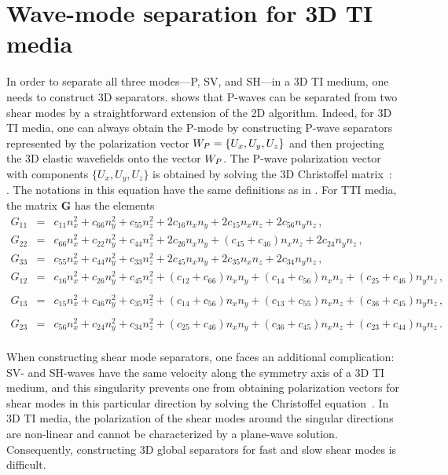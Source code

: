 \section{Wave-mode separation for 3D TI media}
In order to separate all three modes---P, SV, and SH---in a 3D TI
medium, one needs to construct 3D separators. \cite{dellinger.thesis}
shows that P-waves can be separated from two shear modes by a
straightforward extension of the 2D algorithm. Indeed, for 3D TI
media, one can always obtain the P-mode by constructing P-wave separators
represented by the polarization vector $W_P=\{U_x, U_y, U_z \}$
and then projecting the 3D elastic wavefields onto the vector $W_P$. The
P-wave polarization vector with components $\{U_x, U_y, U_z\}$ 
is obtained by solving the 3D
Christoffel matrix~\cite[]{akirichards.2002,Tsvankin}:
\beq\label{VtiChristoffel3d.ch3}
\lb 
\rb
\lb{}  \, .
\eeq
The notations in this equation have the same definitions as in .
For TTI media, the matrix ${\mathbf G}$ has the elements
\begin{eqnarray}
G_{11}&=&c_{11}n_x^2+c_{66}n_y^2+c_{55}n_z^2 
     +2 c_{16}n_xn_y+2 c_{15}n_xn_z+2c_{56}n_yn_z \, ,\\
G_{22}&=&c_{66}n_x^2+c_{22}n_y^2+c_{44}n_z^2 
     +2 c_{26}n_xn_y+ (c_{45}+c_{46})n_xn_z+2c_{24}n_yn_z \, ,\\
G_{33}&=&c_{55}n_x^2+c_{44}n_y^2+c_{33}n_z^2 
     +2 c_{45}n_xn_y+2 c_{35}n_xn_z+2c_{34}n_yn_z \, ,\\
G_{12}&=&c_{16}n_x^2+c_{26}n_y^2+c_{45}n_z^2 
     + (c_{12}+c_{66})n_xn_y+ (c_{14}+c_{56})n_xn_z+(c_{25}+c_{46})n_yn_z \, ,\nonumber\\ \\
G_{13}&=&c_{15}n_x^2+c_{46}n_y^2+c_{35}n_z^2 
     + (c_{14}+c_{56})n_xn_y+ (c_{13}+c_{55})n_xn_z+(c_{36}+c_{45})n_yn_z \, ,\nonumber\\\\
G_{23}&=&c_{56}n_x^2+c_{24}n_y^2+c_{34}n_z^2 
     + (c_{25}+c_{46})n_xn_y+ (c_{36}+c_{45})n_xn_z+(c_{23}+c_{44})n_yn_z \, .\nonumber\\
\end{eqnarray}

When constructing shear mode separators, one faces an additional
complication: SV- and SH-waves have the same velocity along the
symmetry axis of a 3D TI medium, and this singularity prevents one
from obtaining polarization vectors for shear modes in this
particular direction by solving the Christoffel
equation~\cite[]{Tsvankin}. In 3D TI media, the polarization of the
shear modes around the singular directions are non-linear and cannot
be characterized by a plane-wave solution. Consequently, constructing
3D global separators for fast and slow shear modes is difficult.

